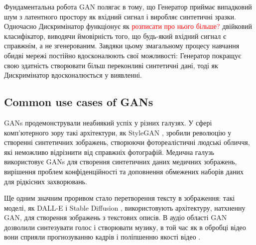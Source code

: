 Фундаментальна робота GAN полягає в тому, що Генератор приймає випадковий шум з латентного простору як вхідний сигнал і виробляє синтетичні зразки. Одночасно Дискримінатор функціонує як \textcolor{red}{розписати про нього більше?} двійковий класифікатор, виводячи ймовірність того, що будь-який вхідний сигнал є справжнім, а не згенерованим. Завдяки цьому змагальному процесу навчання обидві мережі постійно вдосконалюють свої можливості: Генератор покращує свою здатність створювати більш переконливі синтетичні дані, тоді як Дискримінатор вдосконалюється у виявленні.

\subsection{Common use cases of GANs}
GANs продемонстрували неабиякий успіх у різних галузях. У сфері комп'ютерного зору такі архітектури, як StyleGAN \cite{StyleGAN}, зробили революцію у створенні синтетичних зображень, створюючи фотореалістичні людські обличчя, які неможливо відрізнити від справжніх фотографій. Медична галузь використовує GANs для створення синтетичних даних медичних зображень, вирішення проблем конфіденційності та доповнення обмежених наборів даних для рідкісних захворювань.

Ще одним значним проривом стало перетворення тексту в зображення: такі моделі, як DALL-E \cite{DALL-E} і Stable Diffusion \cite{Stable diffusion}, використовують архітектуру, натхненну GAN, для створення зображень з текстових описів. В аудіо області GAN дозволили синтезувати голос і створювати музику, в той час як в обробці відео вони сприяли прогнозуванню кадрів і поліпшенню якості відео \cite{Video to video synthesis}.




\chapconclude{\ref{chap:review}}
